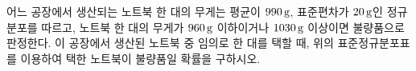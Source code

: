 \noindent\begin{minipage}[t]{0.58\linewidth}\vspace{0pt}\raggedright 어느 공장에서 생산되는 노트북 한 대의 무게는 평균이 $990\mkern3mu \mathrm{g}$, 표준편차가 $20\mkern3mu \mathrm{g}$인 정규분포를 따르고, 노트북 한 대의 무게가 $960\mkern3mu \mathrm{g}$ 이하이거나 $1030\mkern3mu \mathrm{g}$ 이상이면 불량품으로 판정한다. 이 공장에서 생산된 노트북 중 임의로 한 대를 택할 때, 위의 표준정규분포표를 이용하여 택한 노트북이 불량품일 확률을 구하시오.\end{minipage}\hfill\begin{minipage}[t]{0.4\linewidth}\vspace{0pt}\centering \resizebox{\ifdim\width>\linewidth\linewidth\else\width\fi}{!}{}\end{minipage}\par
